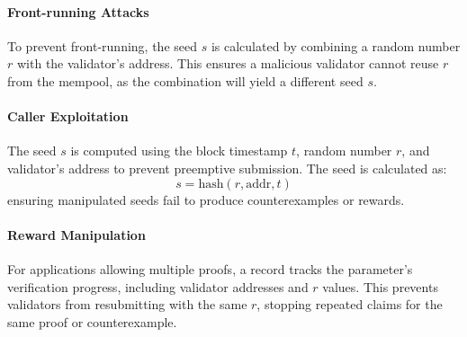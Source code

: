 \documentclass[runningheads]{llncs}
\begin{document}
\paragraph{Front-running Attacks}
To prevent front-running, the seed \( s \) is calculated by combining a random number \( r \) with the validator's address. This ensures a malicious validator cannot reuse \( r \) from the mempool, as the combination will yield a different seed \( s \).
\paragraph{Caller Exploitation}
The seed \( s \) is computed using the block timestamp \( t \), random number \( r \), and validator's address to prevent preemptive submission. The seed is calculated as:
\begin{equation}
s = \text{hash}(r, \text{addr}, t)
\end{equation}
ensuring manipulated seeds fail to produce counterexamples or rewards.
\paragraph{Reward Manipulation}
For applications allowing multiple proofs, a record tracks the parameter's verification progress, including validator addresses and \( r \) values. This prevents validators from resubmitting with the same \( r \), stopping repeated claims for the same proof or counterexample.
\end{document}

